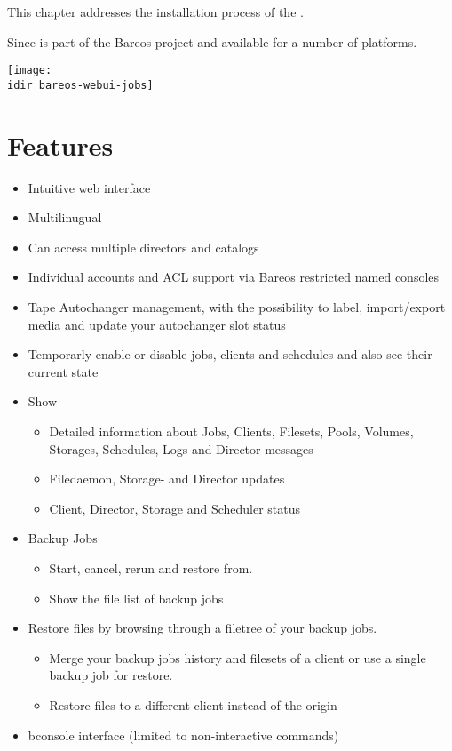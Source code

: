 
This chapter addresses the installation process of the \bareosWebui.

Since  \bareosWebui is part of the Bareos project and available for a number of platforms.

\begin{center}
  \texttt{[image: \\idir bareos-webui-jobs]}
\end{center}

\section{Features}

\begin{itemize}
\item Intuitive web interface
\item Multilinugual
\item Can access multiple directors and catalogs
\item Individual accounts and ACL support via Bareos restricted named consoles
\item Tape Autochanger management, with the possibility to label, import/export media and update your autochanger slot status
\item Temporarly enable or disable jobs, clients and schedules and also see their current state
\item Show
    \begin{itemize}
    \item Detailed information about Jobs, Clients, Filesets, Pools, Volumes, Storages, Schedules, Logs and Director messages
    \item Filedaemon, Storage- and Director updates
    \item Client, Director, Storage and Scheduler status
    \end{itemize}
\item Backup Jobs
    \begin{itemize}
    \item Start, cancel, rerun and restore from.
    \item Show the file list of backup jobs
    \end{itemize}
\item Restore files by browsing through a filetree of your backup jobs.
    \begin{itemize}
    \item Merge your backup jobs history and filesets of a client or use a single backup job for restore.
    \item Restore files to a different client instead of the origin
    \end{itemize}
\item bconsole interface (limited to non-interactive commands)
\end{itemize}

